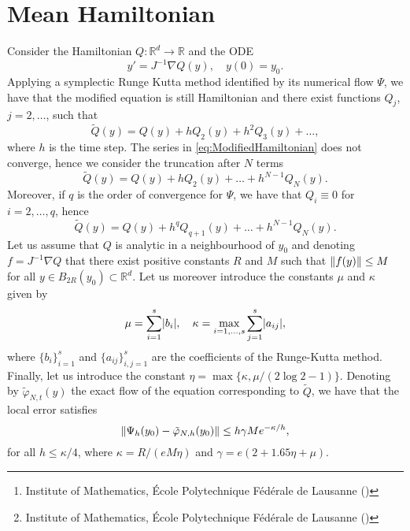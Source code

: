 \documentclass{siamart1116}
\title{{\TheTitle}}
\author{Assyr Abdulle\thanks{Institute of Mathematics, \'Ecole Polytechnique F\'ed\'erale de Lausanne (\email{assyr.abdulle@epfl.ch})}
		\and
		Giacomo Garegnani\thanks{Institute of Mathematics, \'Ecole Polytechnique F\'ed\'erale de Lausanne (\email{giacomo.garegnani@epfl.ch})}}
\numberwithin{theorem}{section}
\DeclarePairedDelimiter{\abs}{\lvert}{\rvert}
\DeclarePairedDelimiter{\norm}{\|}{\|}
\renewcommand{\phi}{\varphi}
\newcommand{\R}{\mathbb{R}}
\begin{document}
\maketitle

\section{Mean Hamiltonian} Consider the Hamiltonian $Q\colon \R^d \to \R$ and the ODE
\begin{equation}
	y' = J^{-1}\nabla Q(y), \quad y(0) = y_0.
\end{equation}
Applying a symplectic Runge Kutta method identified by its numerical flow $\Psi$, we have that the modified equation is still Hamiltonian and there exist functions $Q_j$, $j = 2, \ldots$, such that
\begin{equation}\label{eq:ModifiedHamiltonian}
	\tilde Q(y) = Q(y) + h Q_2(y) + h^2 Q_3(y) + \ldots,
\end{equation}
where $h$ is the time step. The series in \eqref{eq:ModifiedHamiltonian} does not converge, hence we consider the truncation after $N$ terms 
\begin{equation}
	\tilde Q(y) = Q(y) + h Q_2(y) + \ldots + h^{N-1} Q_N(y).
\end{equation}
Moreover, if $q$ is the order of convergence for $\Psi$, we have that $Q_i \equiv 0$ for $i = 2, \ldots, q$, hence
\begin{equation}\label{eq:ModifiedHamiltonianTrunc}
	\tilde Q(y) = Q(y) + h^q Q_{q+1}(y) + \ldots + h^{N-1} Q_N(y).
\end{equation}
Let us assume that $Q$ is analytic in a neighbourhood of $y_0$ and denoting $f = J^{-1}\nabla Q$ that there exist positive constants $R$ and $M$ such that $\norm{f(y)} \leq M$ for all $y \in B_{2R}(y_0) \subset \R^d$. Let us moreover introduce the constants $\mu$ and $\kappa$ given by
\begin{equation}
	\mu = \sum_{i=1}^{s} \abs{b_i}, \quad \kappa = \max_{i=1, \ldots, s} \sum_{j=1}^{s} \abs{a_{ij}},
\end{equation}
where $\{b_i\}_{i=1}^s$ and $\{a_{ij}\}_{i,j=1}^s$ are the coefficients of the Runge-Kutta method. Finally, let us introduce the constant $\eta = \max\{\kappa, \mu/(2\log 2 - 1)\}$. Denoting by $\tilde \phi_{N,t}(y)$ the exact flow of the equation corresponding to $\tilde Q$, we have that the local error satisfies \cite[Theorem IX.7.6]{HLW06}
\begin{equation}\label{eq:LocalErrorModified}
	\norm{\Psi_h(y_0) - \tilde \phi_{N,h}(y_0)} \leq h \gamma M e^{-\kappa / h},
\end{equation}
for all $h \leq \kappa / 4$, where $\kappa = R / (eM\eta)$ and $\gamma = e(2 + 1.65\eta + \mu)$.
\end{document}
